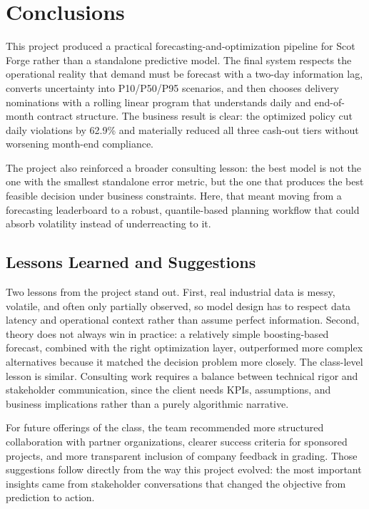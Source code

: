 \documentclass[10pt]{article}
\begin{document}
\section{Conclusions}
This project produced a practical forecasting-and-optimization pipeline for Scot Forge rather than a standalone predictive model. The final system respects the operational reality that demand must be forecast with a two-day information lag, converts uncertainty into P10/P50/P95 scenarios, and then chooses delivery nominations with a rolling linear program that understands daily and end-of-month contract structure. The business result is clear: the optimized policy cut daily violations by 62.9\% and materially reduced all three cash-out tiers without worsening month-end compliance.

The project also reinforced a broader consulting lesson: the best model is not the one with the smallest standalone error metric, but the one that produces the best feasible decision under business constraints. Here, that meant moving from a forecasting leaderboard to a robust, quantile-based planning workflow that could absorb volatility instead of underreacting to it.

\subsection{Lessons Learned and Suggestions}
Two lessons from the project stand out. First, real industrial data is messy, volatile, and often only partially observed, so model design has to respect data latency and operational context rather than assume perfect information. Second, theory does not always win in practice: a relatively simple boosting-based forecast, combined with the right optimization layer, outperformed more complex alternatives because it matched the decision problem more closely. The class-level lesson is similar. Consulting work requires a balance between technical rigor and stakeholder communication, since the client needs KPIs, assumptions, and business implications rather than a purely algorithmic narrative.

For future offerings of the class, the team recommended more structured collaboration with partner organizations, clearer success criteria for sponsored projects, and more transparent inclusion of company feedback in grading. Those suggestions follow directly from the way this project evolved: the most important insights came from stakeholder conversations that changed the objective from prediction to action.
\end{document}
